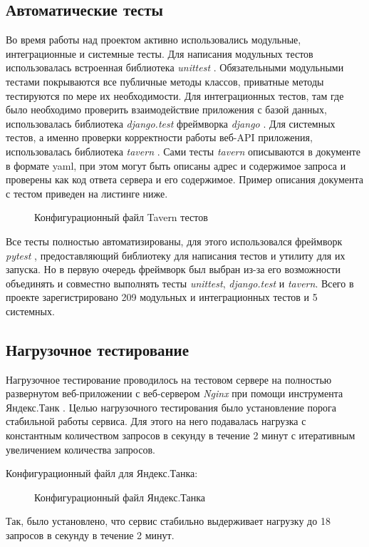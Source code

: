     \subsection{Автоматические тесты}
    Во время работы над проектом активно использовались модульные,
    интеграционные и системные тесты. \cite{test.kulikov}
    Для написания модульных тестов использовалась
    встроенная библиотека \textit{unittest} \cite{test.unittest}.
    Обязательными модульными тестами покрываются все публичные методы классов,
    приватные методы тестируются по мере их необходимости.
    Для интеграционных тестов,
    там где было необходимо проверить взаимодействие приложения с базой данных,
    использовалась библиотека \textit{django.test} фреймворка \textit{django}
    \cite{docs.django}.
    Для системных тестов, а именно проверки корректности работы веб-API
    приложения, использовалась библиотека \textit{tavern} \cite{test.tavern}.
    Сами тесты \textit{tavern} описываются в документе в формате yaml, при этом
    могут быть описаны адрес и содержимое запроса и
    проверены как код ответа сервера и его содержимое.
    Пример описания документа с тестом приведен на листинге ниже.
    \begin{figure}[H]
        \centering
        
        \caption{Конфигурационный файл Tavern тестов}
        \label{fig:tavern-tests}
    \end{figure}

    Все тесты полностью автоматизированы, для этого использовался
    фреймворк \textit{pytest} \cite{test.pytest},
    предоставляющий библиотеку для написания тестов и
    утилиту для их запуска. Но в первую очередь фреймворк был выбран из-за его
    возможности объединять и совместно выполнять тесты
    \textit{unittest}, \textit{django.test} и \textit{tavern}.
    Всего в проекте зарегистрировано 209 модульных и интеграционных тестов и
    5 системных.

    \subsection{Нагрузочное тестирование}
    Нагрузочное тестирование проводилось на тестовом сервере на полностью
    развернутом веб-приложении с веб-сервером \textit{Nginx} при помощи
    инструмента Яндекс.Танк \cite{test.yandex.tank}.
    Целью нагрузочного тестирования было установление
    порога стабильной работы сервиса. Для этого на него подавалась нагрузка
    с константным количеством запросов в секунду в течение 2 минут с итеративным
    увеличением количества запросов.

    Конфигурационный файл для Яндекс.Танка:
    \begin{figure}[H]
        \centering
        
        \caption{Конфигурационный файл Яндекс.Танка}
        \label{fig:tank-load}
    \end{figure}

    Так, было установлено, что сервис стабильно выдерживает нагрузку до 18
    запросов в секунду в течение 2 минут.
